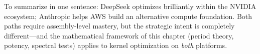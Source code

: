 \documentclass[12pt]{article}
\begin{document}
To summarize in one sentence: DeepSeek optimizes brilliantly within the NVIDIA ecosystem; Anthropic helps AWS build an alternative compute foundation. Both paths require assembly-level mastery, but the strategic intent is completely different---and the mathematical framework of this chapter (period theory, potency, spectral tests) applies to kernel optimization on \emph{both} platforms.


\bigskip










\end{document}
